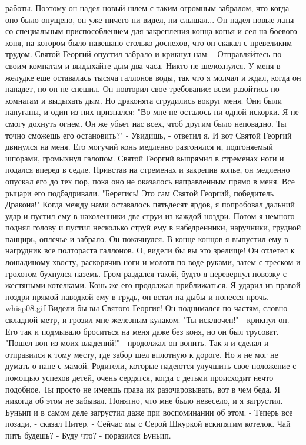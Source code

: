 работы. Поэтому он надел новый шлем с таким огромным забралом, что 
когда оно было опущено, он уже ничего ни видел, ни слышал... Он надел 
новые латы со специальным приспособлением для закрепления конца копья 
и сел на боевого коня, на котором было навешано столько доспехов, что 
он скакал с превеликим трудом.
    Святой Георгий опустил забрало и крикнул нам:
    - Отправляйтесь по своим комнатам и выдыхайте дым два часа.
    Никто не шелохнулся.
    У меня в желудке еще оставалась тысяча галлонов воды, так что я 
молчал и ждал, когда он нападет, но он не спешил. Он повторил свое 
требование: всем разойтись по комнатам и выдыхать дым. Но драконята 
сгрудились вокруг меня. Они были напуганы, и один из них признался: 
"Во мне не осталось ни одной искорки. Я не смогу дохнуть огнем. Он же 
убьет нас всех, чтоб другим было неповадно. Ты точно сможешь его 
остановить?"
    - Увидишь, - ответил я.
    И вот Святой Георгий двинулся на меня. Его могучий конь медленно 
разгонялся и, подгоняемый шпорами, громыхнул галопом. Святой Георгий 
выпрямил в стременах ноги и подался вперед в седле. Привстав на 
стременах и закрепив копье, он медленно опускал его до тех пор, пока 
оно не оказалось направленным прямо в меня. Все рыцари его 
подбадривали. "Берегись! Это сам Святой Георгий, победитель Дракона!"
    Когда между нами оставалось пятьдесят ярдов, я попробовал дальний 
удар и пустил ему в наколенники две струи из каждой ноздри. Потом я 
немного поднял голову и пустил несколько струй ему в набедренники, 
наручники, грудной панцирь, оплечье и забрало. Он покачнулся. В конце 
концов я выпустил ему в нагрудник все полтораста галлонов. О, видели 
бы вы это зрелище! Он отлетел к лошадиному хвосту, раскорячив ноги и 
молотя по воде руками, затем с треском и грохотом бухнулся наземь. 
Гром раздался такой, будто я перевернул повозку с жестяными котелками. 
Конь же его продолжал приближаться. Я ударил из правой ноздри прямой 
наводкой ему в грудь, он встал на дыбы и понесся прочь.
    {whisp08.gif}
    Видели бы вы Святого Георгия! Он поднимался по частям, словно 
складной метр, и грозил мне железным кулаком. "Ты исключен!" - крикнул 
он. Его так и подмывало броситься на меня даже без коня, но он был 
трусоват. "Пошел вон из моих владений!" - продолжал он вопить.
    Так я и сделал и отправился к тому месту, где забор шел вплотную к 
дороге. Но я не мог не думать о папе с мамой. Родители, которые 
надеются улучшить свое положение с помощью успехов детей, очень 
сердятся, когда с детьми происходит нечто подобное. Ты просто не 
имеешь права их разочаровывать, вот в чем беда. Я никогда об этом не 
забывал. Понятно, что мне было невесело, и я загрустил.
    Буньип и в самом деле загрустил даже при воспоминании об этом.
    - Теперь все позади, - сказал Питер. - Сейчас мы с Серой Шкуркой 
вскипятим котелок. Чай пить будешь?
    - Буду что? - поразился Буньип.

